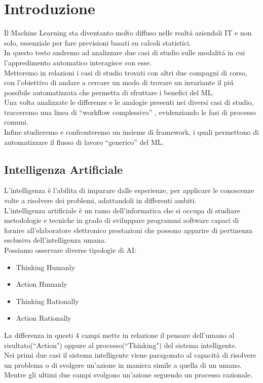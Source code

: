 \documentclass[../tesi.tex]{subfiles}
\begin{document}
\chapter{Introduzione}

Il Machine Learning sta diventanto molto diffuso nelle realtá aziendali IT e non solo, essenziale per fare previsioni basati su calcoli statistici.\\
In questo testo andremo ad analizzare due casi di studio sulle modalitá in cui l’appredimento automatico  interagisce con esse.\\
Metteremo in relazioni i casi di studio trovati con altri due compagni di corso, con l’obiettivo di andare a cercare un modo di trovare un invariante il piú possibile automatizzata che permetta di sfruttare i benefici del ML.\\
Una volta analizzate le differenze e le analogie presenti nei diversi casi di studio, tracceremo una linea di ``workflow complessivo” , evidenziando le fasi di processo comuni.\\
Infine studieremo e confronteremo un insieme di framework, i quali permettono di automatizzare il flusso di lavoro “generico” del ML.
\newpage
\section{Intelligenza Artificiale}
L’intelligenza è l’abilita di imparare dalle esperienze, per applicare le conoscenze volte a risolvere dei problemi, adattandoli in differenti ambiti.\\
L’intelligenza artificiale è un ramo dell’informatica che si occupa di studiare metodologie e tecniche in grado di sviluppare programmi software capaci di fornire all’elaboratore elettronico prestazioni che possono apparire di pertinenza esclusiva dell’intelligenza umana.\\
Possiamo osservare diverse tipologie di AI:
\begin{itemize}
  \item Thinking Humanly
  \item Action Humanly
  \item Thinking Rationally
  \item Action Rationally
\end{itemize}
La differenza in questi 4 campi mette in relazione il pensare dell’umano al risultato(``Action") oppure al processo(``Thinking") del sistema intelligente.\\Nei primi due casi il sistema intelligente viene paragonato al capacità di risolvere un problema o di svolgere un’azione in maniera simile a quella di un umano.\\
Mentre gli ultimi due campi svolgono un’azione seguendo un processo razionale.
\end{document}
